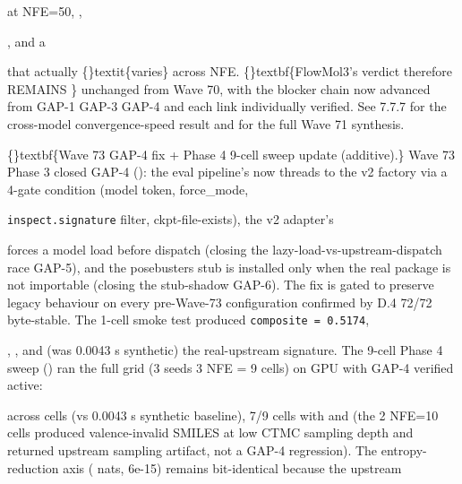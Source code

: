 \documentclass{article}
\begin{document}
 at NFE=50, ,

, and a

 that actually \{\}textit\{varies\} across NFE. \{\}textbf\{FlowMol3's verdict therefore REMAINS \}  unchanged from Wave 70, with the blocker chain now advanced from GAP-1  GAP-3  GAP-4 and each link individually verified. See 7.7.7 for the cross-model convergence-speed result and  for the full Wave 71 synthesis.

\{\}textbf\{Wave 73 GAP-4 fix + Phase 4 9-cell sweep update (additive).\} Wave 73 Phase 3 closed GAP-4 (): the eval pipeline's  now threads  to the v2 factory via a 4-gate condition (model token, force\_mode,

\texttt{inspect.signature} filter, ckpt-file-exists), the v2 adapter's

 forces a model load before dispatch (closing the lazy-load-vs-upstream-dispatch race GAP-5), and the posebusters stub is installed only when the real package is not importable (closing the stub-shadow GAP-6). The fix is gated to preserve legacy behaviour on every pre-Wave-73 configuration  confirmed by D.4 72/72 byte-stable. The 1-cell smoke test produced \texttt{composite = 0.5174},

, , and  (was 0.0043 s synthetic)  the real-upstream signature. The 9-cell Phase 4 sweep () ran the full grid (3 seeds  3 NFE = 9 cells) on GPU with GAP-4 verified active:

 across cells (vs 0.0043 s synthetic baseline), 7/9 cells with  and  (the 2 NFE=10 cells produced valence-invalid SMILES at low CTMC sampling depth and returned   upstream sampling artifact, not a GAP-4 regression). The entropy-reduction axis ( nats,   6e-15) remains bit-identical because the upstream
\end{document}
